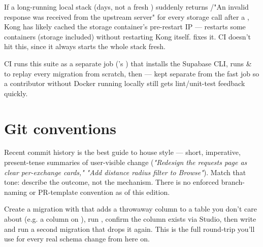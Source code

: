 \begin{olkwarn}
If a long-running local stack (days, not a fresh ) suddenly returns /\allowbreak{}"An invalid response was received from the upstream server" for every storage call after a , Kong has likely cached the storage container's pre-restart IP —  restarts some containers (storage included) without restarting Kong itself.  fixes it. CI doesn't hit this, since it always starts the whole stack fresh.
\end{olkwarn}

CI runs this suite as a separate job ('s ) that installs the Supabase CLI, runs  \&  to replay every migration from scratch, then  — kept separate from the fast  job so a contributor without Docker running locally still gets lint/unit-test feedback quickly.

\section{Git conventions}

Recent commit history is the best guide to house style — short, imperative, present-tense summaries of user-visible change (\emph{"Redesign the requests page as clear per-exchange cards,"} \emph{"Add distance radius filter to Browse"}). Match that tone: describe the outcome, not the mechanism. There is no enforced branch-naming or PR-template convention as of this edition.

\begin{olktask}
Create a migration with  that adds a throwaway column to a table you don't care about (e.g. a  column on ), run , confirm the column exists via Studio, then write and run a second migration that drops it again. This is the full round-trip you'll use for every real schema change from here on.
\end{olktask}
